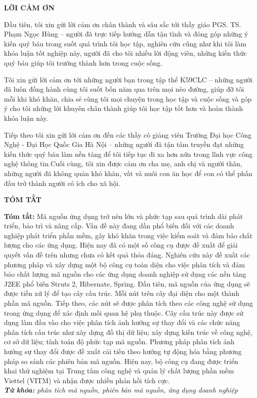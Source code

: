 \documentclass[12pt]{report}
\begin{document}
\newpage
\begin{titlepage}
\begin{center}
	\textbf{\large LỜI CẢM ƠN}
\end{center}
Đầu tiên, tôi xin gửi lời cảm ơn chân thành và sâu sắc tới thầy giáo PGS. TS. Phạm Ngọc Hùng – người đã trực tiếp hướng dẫn tận tình và đóng góp những ý kiến quý báu trong suốt quá trình tôi học tập, nghiên cứu cũng như khi tôi làm khóa luận tốt nghiệp này, người đã cho tôi nhiều lời động viên, những kiến thức quý báu giúp tôi trưởng thành hơn trong cuộc sống.

Tôi xin gửi lời cảm ơn tới những người bạn trong tập thể K59CLC – những người đã luôn đồng hành cùng tôi suốt bốn năm qua trên mọi nẻo đường, giúp đỡ tôi mỗi khi khó khăn, chia sẻ cùng tôi mọi chuyện trong học tập và cuộc sống và góp ý cho tôi những lời khuyên chân thành giúp tôi học tập tốt hơn và hoàn thành khóa luận này.

Tiếp theo tôi xin gửi lời cảm ơn đến các thầy cô giảng viên Trường Đại học Công Nghệ - Đại Học Quốc Gia Hà Nội – những người đã tận tâm truyền đạt những kiến thức quý báu làm nền tảng để tôi tiếp tục đi xa hơn nữa trong lĩnh vực công nghệ thông tin.Cuối cùng, tôi xin được cảm ơn cha mẹ, anh chị và người thân, những người đã không quản khó khăn, vất vả nuôi con ăn học để con có thể phấn đấu trở thành người có ích cho xã hội.
\end{titlepage}

	
\newpage
\begin{titlepage}
\begin{center}
	\textbf{\large TÓM TẮT}
\end{center}
\textbf{Tóm tắt:} Mã nguồn ứng dụng trở nên lớn và phức tạp sau quá trình dài phát triển, bảo trì và nâng cấp. Vấn đề này đang dần phổ biến đối với các doanh nghiệp phát triển phần mềm, gây khó khăn trong việc kiểm soát và đảm bảo chất lượng cho các ứng dụng. Hiện nay đã có một số công cụ được đề xuất để giải quyết vấn đề trên nhưng chưa có kết quả thỏa đáng. Nghiên cứu này đề xuất các phương pháp và xây dựng một bộ công cụ toàn diện cho việc phân tích và đảm bảo chất lượng mã nguồn cho các ứng dụng doanh nghiệp sử dụng các nền tảng J2EE phổ biến Struts 2, Hibernate, Spring. Đầu tiên, mã nguồn của ứng dụng sẽ được tiền xử lý để tạo cây cấu trúc. Mỗi nút trên cây đại diện cho một thành phần mã nguồn. Tiếp theo, các nút sẽ được phân tích theo các công nghệ sử dụng trong ứng dụng để xác định mối quan hệ phụ thuộc. Cây cấu trúc này được sử dụng làm đầu vào cho việc phân tích ảnh hưởng sự thay đổi và các chức năng phân tích cấu trúc như xây dựng đồ thị dữ liệu; xây dựng kiến trúc về công nghệ, cơ sở dữ liệu; tính toán độ phức tạp mã nguồn. Phương pháp phân tích ảnh hưởng sự thay đổi được đề xuất cải tiến theo hướng tự động hóa bằng phương pháp so sánh các phiên bản mã nguồn. Hiện nay, bộ công cụ đang được triển khai thử nghiệm tại Trung tâm công nghệ và quản lý chất lượng phần mềm Viettel (VITM) và nhận được nhiều phản hồi tích cực.\\

\noindent \textit{\textbf{Từ khóa:} phân tích mã nguồn, phiên bản mã nguồn, ứng dụng doanh nghiệp}
\end{titlepage}
\end{document}
